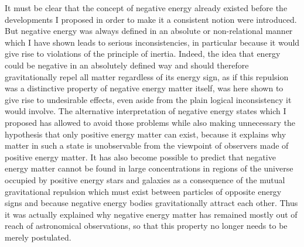 \documentclass[notitlepage,12pt]{report}
\begin{document}
It must be clear that the concept of negative energy already existed before the developments I proposed in order to make it a consistent notion were introduced. But negative energy was always defined in an absolute or non-relational manner which I have shown leads to serious inconsistencies, in particular because it would give rise to violations of the principle of inertia. Indeed, the idea that energy could be negative in an absolutely defined way and should therefore gravitationally repel all matter regardless of its energy sign, as if this repulsion was a distinctive property of negative energy matter itself, was here shown to give rise to undesirable effects, even aside from the plain logical inconsistency it would involve. The alternative interpretation of negative energy states which I proposed has allowed to avoid those problems while also making unnecessary the hypothesis that only positive energy matter can exist, because it explains why matter in such a state is unobservable from the viewpoint of observers made of positive energy matter. It has also become possible to predict that negative energy matter cannot be found in large concentrations in regions of the universe occupied by positive energy stars and galaxies as a consequence of the mutual gravitational repulsion which must exist between particles of opposite energy signs and because negative energy bodies gravitationally attract each other. Thus it was actually explained why negative energy matter has remained mostly out of reach of astronomical observations, so that this property no longer needs to be merely postulated.
\end{document}
